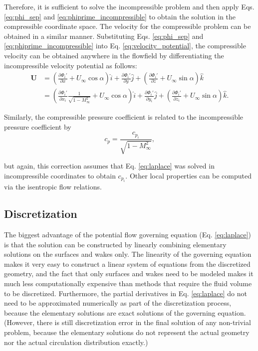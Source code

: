 \documentclass[11pt]{article}
\begin{document}
\noindent Therefore, it is sufficient to solve the incompressible problem and
then apply Eqs. \ref{eq:phi_sep} and \ref{eq:phiprime_incompressible} to obtain
the solution in the compressible coordinate space. The velocity for the
compressible problem can be obtained in a similar manner.
Substituting Eqs. \ref{eq:phi_sep} and \ref{eq:phiprime_incompressible} into
Eq. \ref{eq:velocity_potential}, the compressible velocity can be
obtained anywhere in the flowfield by differentiating the
incompressible velocity potential as follows:
\begin{align}
	\label{eq:velocity_compressible}
	\mathbf{U} & = \left(\frac{\partial\Phi_i'}{\partial x} +
	                    U_\infty\cos\alpha\right)\hat{i} +
	              \frac{\partial\Phi_i'}{\partial y}\hat{j} +
	              \left(\frac{\partial\Phi_i'}{\partial z} +
	                    U_\infty\sin\alpha\right)\hat{k} \\ \nonumber
	           & = \left(\frac{\partial\Phi_i'}{\partial x_i}
	                    \frac{1}{\sqrt{1 - M_\infty^2}} +
	                    U_\infty\cos\alpha\right)\hat{i} + 
	              \frac{\partial\Phi_i'}{\partial y_i}\hat{j} +
	              \left(\frac{\partial\Phi_i'}{\partial z_i} +
	                    U_\infty\sin\alpha\right)\hat{k}. \nonumber
\end{align}

Similarly, the compressible pressure coefficient is related to the
incompressible pressure coefficient by
\begin{equation}
	c_p = \frac{c_{p_i}}{\sqrt{1 - M_\infty^2}},
	\label{eq:cp_compressible}
\end{equation}

\noindent but again, this correction assumes that Eq. \ref{eq:laplace} was
solved in incompressible coordinates to obtain $c_{p_i}$. Other local properties
can be computed via the isentropic flow relations.

\subsection{Discretization}\label{sec:discretization}

The biggest advantage of the potential flow governing equation
(Eq. \ref{eq:laplace}) is that the solution can be constructed by linearly
combining elementary solutions on the surfaces and wakes only. The linearity of
the governing equation makes it very easy to construct a linear system of
equations from the discretized geometry, and the fact that only surfaces and
wakes need to be modeled makes it much less computationally expensive than
methods that require the fluid volume to be discretized. Furthermore, the
partial derivatives in Eq. \ref{eq:laplace} do not need to be approximated
numerically as part of the discretization process, because the elementary
solutions are exact solutions of the governing equation. (However, there is
still discretization error in the final solution of any non-trivial problem,
because the elementary solutions do not represent the actual geometry nor the
actual circulation distribution exactly.)
\end{document}
